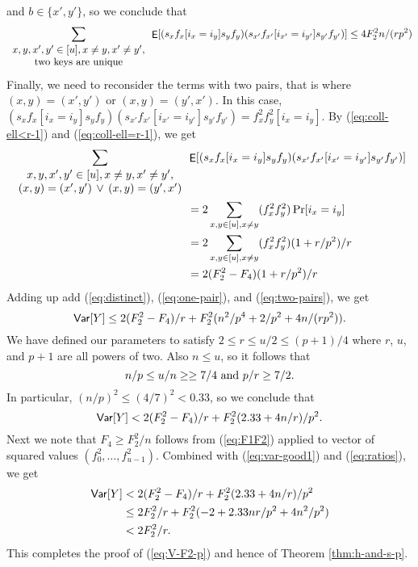 \documentclass[12pt]{article}
\DeclareMathOperator*{\E}{\sf{E}}
\newcommand{\Var}{{\sf Var}}
\newcommand{\req}[1]{(\ref{#1})}
\begin{document}
and $b\in \{x',y'\}$, so we conclude that
\begin{equation}\label{eq:one-pair}
\sum_{\begin{array}{c}x,y,x',y'\in[u], x\neq y, x'\neq y',\\
{\rm two\ keys\ are\ unique}\end{array}}
\E[(s_x f_x[i_x=i_y]s_y f_y)
(s_{x'}f_{x'}[i_{x'}=i_{y'}]s_{y'} f_{y'})]\leq 4 F_2^2 n/(rp^2)
\end{equation}
Finally, we need to reconsider the terms with two pairs, that
is where $(x,y)=(x',y')$ or $(x,y)=(y',x')$. In
this case, $(s_x f_x[i_x=i_y]s_y f_y)
(s_{x'}f_{x'}[i_{x'}=i_{y'}]s_{y'} f_{y'})=f_x^2f_y^2[i_x=i_y]$.
By \req{eq:coll-ell<r-1} and \req{eq:coll-ell=r-1},  we 
get 
\begin{align}
\sum_{\begin{array}{c}x,y,x',y'\in[u], x\neq y, x'\neq y',\\
(x,y)=(x',y')\,\vee\,(x,y)=(y',x')\end{array}}&
\E[(s_x f_x[i_x=i_y]s_y f_y)
(s_{x'}f_{x'}[i_{x'}=i_{y'}]s_{y'} f_{y'})]\nonumber\\
&=2\sum_{x,y\in[u],x\neq y}(f_x^2f_y^2)\Pr[i_x=i_y]\nonumber\\
&=2\sum_{x,y\in[u],x\neq y}(f_x^2f_y^2)(1+r/p^2)/r\nonumber\\
&=2(F_2^2-F_4)(1+r/p^2)/r\label{eq:two-pairs}
\end{align}
Adding up add \req{eq:distinct}, \req{eq:one-pair}, and
\req{eq:two-pairs}, we get 
\[\Var[Y]\leq 2(F_2^2-F_4)/r+F_2^2 (n^2/p^4+2/p^2+4 n/(rp^2)).\]
We have defined our parameters to satisfy $2\leq r\leq u/2\leq (p+1)/4$
where $r$, $u$, and $p+1$ are all powers of two. Also $n\leq u$, so it 
follows that
\begin{equation}
n/p\leq u/n\geq\geq 7/4\textnormal{ and }p/r\geq 7/2.\label{eq:ratios}
\end{equation}
In particular, $(n/p)^2\leq(4/7)^2<0.33$, so we conclude
that
\begin{equation}\label{eq:var-good1}
\Var[Y]<2(F_2^2-F_4)/r+F_2^2 (2.33+4 n/r)/p^2.
\end{equation}
Next we note that $F_4\geq F_2^2/n$ follows from \req{eq:F1F2} applied
to vector of squared values $(f_0^2,\ldots,f_{u-1}^2)$. Combined
with \req{eq:var-good1} and \req{eq:ratios}, we get
\begin{align*}
\Var[Y]&<2(F_2^2-F_4)/r+F_2^2 (2.33+4 n/r)/p^2\\
&\leq 2F_2^2/r+F_2^2(-2+2.33nr/p^2+4 n^2/p^2)\\
&<2F_2^2/r.
\end{align*}
This completes the proof of \req{eq:V-F2-p}  and hence
of Theorem \ref{thm:h-and-s-p}.
\end{document}
